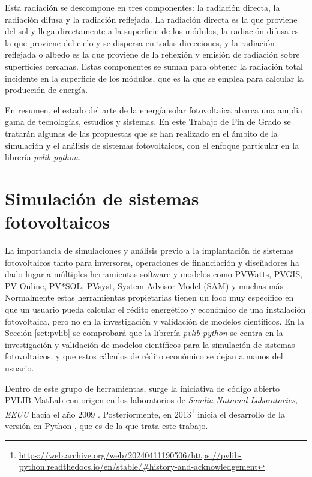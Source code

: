 Esta radiación se descompone en tres componentes: la radiación directa, la radiación difusa y la radiación reflejada. La radiación directa es la que proviene del sol y llega directamente a la superficie de los módulos, la radiación difusa es la que proviene del cielo y se dispersa en todas direcciones, y la radiación reflejada o albedo es la que proviene de la reflexión y emisión de radiación sobre superficies cercanas. Estas componentes se suman para obtener la radiación total incidente en la superficie de los módulos, que es la que se emplea para calcular la producción de energía.

En resumen, el estado del arte de la energía solar fotovoltaica abarca una amplia gama de tecnologías, estudios y sistemas. En este Trabajo de Fin de Grado se tratarán algunas de las propuestas que se han realizado en el ámbito de la simulación y el análisis de sistemas fotovoltaicos, con el enfoque particular en la librería \textit{pvlib-python}.

\section{Simulación de sistemas fotovoltaicos} \label{sct:simulaciones}

La importancia de simulaciones y análisis previo a la implantación de sistemas fotovoltaicos tanto para inversores, operaciones de financiación y diseñadores ha dado lugar a múltiples herramientas software y modelos como PVWatts, PVGIS, PV-Online, PV*SOL, PVsyst, System Advisor Model (SAM) y muchas más \cite{stein_models_2009, Kumar_2017}. Normalmente estas herramientas propietarias tienen un foco muy específico en que un usuario pueda calcular el rédito energético y económico de una instalación fotovoltaica, pero no en la investigación y validación de modelos científicos. En la Sección \ref{sct:pvlib} se comprobará que la librería \textit{pvlib-python} se centra en la investigación y validación de modelos científicos para la simulación de sistemas fotovoltaicos, y que estos cálculos de rédito económico se dejan a manos del usuario.

Dentro de este grupo de herramientas, surge la iniciativa de código abierto PVLIB-MatLab con origen en los laboratorios de \textit{Sandia National Laboratories, EEUU} hacia el año 2009 \cite{Stein_Holmgren_Forbess_Hansen_2016}. Posteriormente, en 2013\footnote{\url{https://web.archive.org/web/20240411190506/https://pvlib-python.readthedocs.io/en/stable/\#history-and-acknowledgement}} inicia el desarrollo de la versión en Python \cite{Anderson_Hansen_Holmgren_Jensen_Mikofski_Driesse_2023, Stein_2012, Andrews_Stein_Hansen_Riley_2014, Holmgren_Andrews_Lorenzo_Stein_2015, Holmgren_Groenendyk_2016}, que es de la que trata este trabajo.

